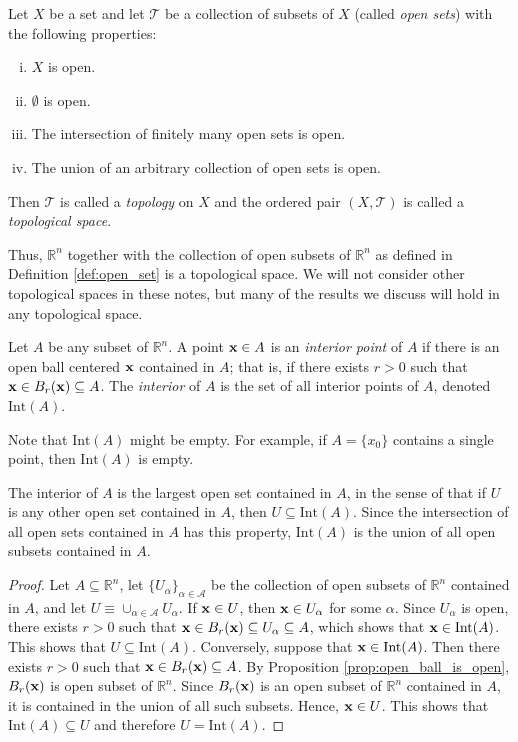 \documentclass[12pt,letterpaper,reqno]{article}
\numberwithin{equation}{section}
\newcommand{\R}{\ensuremath{\mathbb R}}
\newcommand{\bx}{{\bf x}}
\begin{document}
{\begin{defn}
	Let $X$ be a set and let $\mathscr{T}$ be a collection of subsets of $X$ (called \emph{open sets}) with the following properties:
	\begin{enumerate}[(i)]
		\item $X$ is open.
		\item $\emptyset$ is open.
		\item The intersection of finitely many open sets is open.
		\item The union of an arbitrary collection of open sets is open.
	\end{enumerate}
	Then $\mathscr{T}$ is called a \emph{topology} on $X$ and the ordered pair $(X,\mathscr{T})$ is called a \emph{topological space}.
\end{defn}
Thus, $\R^n$ together with the collection of open subsets of $\R^n$ as defined in Definition \ref{def:open_set} is a topological space. We will not consider other topological spaces in these notes, but many of the results we discuss will hold in any topological space. 

\begin{defn}
	Let $A$ be any subset of $\R^n$. A point $\bx \in A$ is an \emph{interior point} of $A$ if there is an open ball centered $\bx$ contained in $A$; that is, if there exists $r>0$ such that $\bx \in B_r(\bx) \subseteq A$. The \emph{interior} of $A$ is the set of all interior points of $A$, denoted $\text{Int}(A)$.
\end{defn}

Note that $\text{Int}(A)$ might be empty. For example, if $A=\{x_0\}$ contains a single point, then $\text{Int}(A)$ is empty.

\begin{prop}
The interior of $A$ is the largest open set contained in $A$, in the sense of that if $U$ is any other open set contained in $A$, then $U \subseteq \text{Int}(A)$. Since the intersection of all open sets contained in $A$ has this property, $\text{Int}(A)$ is the union of all open subsets contained in $A$.	
\end{prop}

\begin{proof}
	Let $A \subseteq \R^n$, let $\{U_\alpha\}_{\alpha \in \mathscr{A}}$ be the collection of open subsets of $\R^n$ contained in $A$, and let $U\equiv \cup_{\alpha \in \mathscr{A}} U_\alpha$. If $\bx \in U$, then $\bx \in U_\alpha$ for some $\alpha$. Since $U_\alpha$ is open, there exists $r>0$ such that $\bx \in B_r(\bx) \subseteq U_\alpha \subseteq A$, which shows that $\bx \in \text{Int}(A)$. This shows that $U \subseteq \text{Int}(A)$. Conversely, suppose that $\bx \in \text{Int}(A)$. Then there exists $r>0$ such that $\bx \in B_r(\bx) \subseteq A$. By Proposition \ref{prop:open_ball_is_open}, $B_r(\bx)$ is open subset of $\R^n$. Since $B_r(\bx)$ is an open subset of $\R^n$ contained in $A$, it is contained in the union of all such subsets. Hence, $\bx \in U$. This shows that $\text{Int}(A)\subseteq U$ and therefore $U=\text{Int}(A)$.
\end{proof}

}
\end{document}
